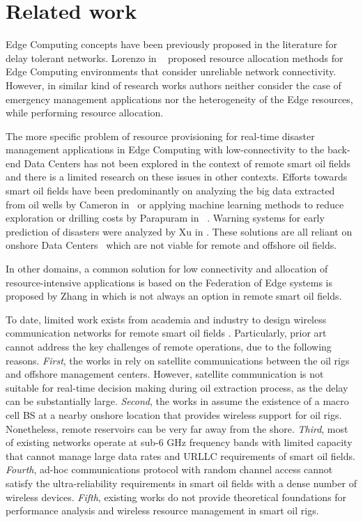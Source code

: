 \section{Related work}\label{Related work}
Edge Computing concepts have been previously proposed in the literature for delay tolerant networks. Lorenzo \etal in ~\cite{lorenzo2017robust} proposed resource allocation methods for Edge Computing environments that consider unreliable network connectivity. However, in similar kind of research works \cite{7926320,wang13,zhu17} authors neither consider the case of emergency management applications nor the heterogeneity of the Edge resources, while performing resource allocation.

The more specific problem of resource provisioning for real-time disaster management applications in Edge Computing with low-connectivity to the back-end Data Centers has not been explored in the context of remote smart oil fields and there is a limited research on these issues in other contexts. Efforts towards smart oil fields have been predominantly on analyzing the big data extracted from oil wells by Cameron \etal in~\cite{cameron14} or applying machine learning methods to reduce exploration or drilling costs by Parapuram \etal in ~\cite{mehdi2017}. Warning systems for early prediction of disasters were analyzed by Xu \etal in \cite{xu17}. These solutions are all reliant on onshore Data Centers~\cite{jun15} which are not viable for remote and offshore oil fields.

In other domains, a common solution for low connectivity and allocation of resource-intensive applications is based on the Federation of Edge systems is proposed by Zhang \etal in \cite{zhang2010load} which is not always an option in remote smart oil fields.

To date, limited work exists from academia and industry to design wireless communication networks for remote smart oil fields \cite{sof2,sof1,sof3,sof4,sof5, sof6}. Particularly, prior art cannot address the key challenges of remote operations, due to the following reasons. \emph{First}, the works in \cite{bogaert2004improving} rely on satellite communications between the oil rigs and offshore management centers. However, satellite communication is not suitable for real-time decision making during oil extraction process, as the delay can be substantially large. \emph{Second}, the works in \cite{prabhu2017smart} assume the existence of a macro cell BS at a nearby onshore location that provides wireless support for oil rigs. Nonetheless, remote reservoirs can be very far away from the shore. \emph{Third}, most of existing networks \cite{reza2010applications} operate at sub-6 GHz frequency bands with limited capacity that cannot manage large data rates and URLLC requirements of smart oil fields. \emph{Fourth}, ad-hoc communications protocol with random channel access cannot satisfy the ultra-reliability requirements in smart oil fields with a dense number of wireless devices. \emph{Fifth}, existing works do not provide theoretical foundations for performance analysis and wireless resource management in smart oil rigs.